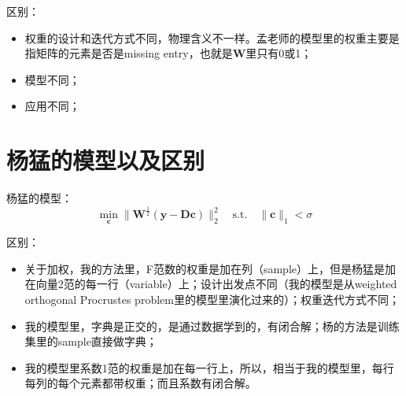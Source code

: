 \documentclass[10pt,twocolumn,letterpaper]{article}
\begin{document}
区别：
\begin{itemize}
\item 权重的设计和迭代方式不同，物理含义不一样。孟老师的模型里的权重主要是指矩阵的元素是否是missing entry，也就是$\mathbf{W}$里只有0或1；
\item 模型不同；
\item 应用不同；
\end{itemize}

\section{杨猛的模型以及区别}
杨猛的模型：
\begin{equation}
\min_{\mathbf{c}}\|\mathbf{W}^{\frac{1}{2}}(\mathbf{y}-\mathbf{D}\mathbf{c})\|_{2}^{2}
\quad
\text{s.t.}
\quad
\|\mathbf{c}\|_{1}<\sigma
\end{equation}

区别：
\begin{itemize}
\item 关于加权，我的方法里，F范数的权重是加在列（sample）上，但是杨猛是加在向量2范的每一行（variable）上；设计出发点不同（我的模型是从weighted orthogonal Procrustes problem里的模型里演化过来的）；权重迭代方式不同；
\item 我的模型里，字典是正交的，是通过数据学到的，有闭合解；杨的方法是训练集里的sample直接做字典；
\item 我的模型里系数1范的权重是加在每一行上，所以，相当于我的模型里，每行每列的每个元素都带权重；而且系数有闭合解。
\end{itemize}



{\small


}
\end{document}
